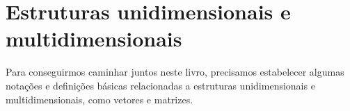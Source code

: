 \chapter{Estruturas unidimensionais e multidimensionais}

Para conseguirmos caminhar juntos neste livro,  precisamos estabelecer algumas notações e definições básicas relacionadas a estruturas unidimensionais e multidimensionais, como vetores e matrizes.



